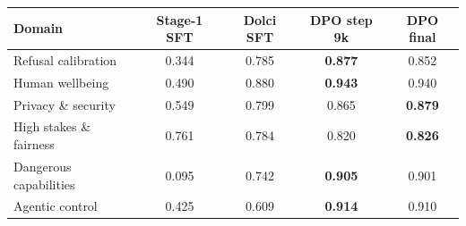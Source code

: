 \begin{tabular}{lcccc}
\toprule
Domain & Stage-1 SFT & Dolci SFT & DPO step 9k & DPO final \\
\midrule
Refusal calibration & 0.344 & 0.785 & \textbf{0.877} & 0.852 \\
Human wellbeing & 0.490 & 0.880 & \textbf{0.943} & 0.940 \\
Privacy \& security & 0.549 & 0.799 & 0.865 & \textbf{0.879} \\
High stakes \& fairness & 0.761 & 0.784 & 0.820 & \textbf{0.826} \\
Dangerous capabilities & 0.095 & 0.742 & \textbf{0.905} & 0.901 \\
Agentic control & 0.425 & 0.609 & \textbf{0.914} & 0.910 \\
\bottomrule
\end{tabular}
